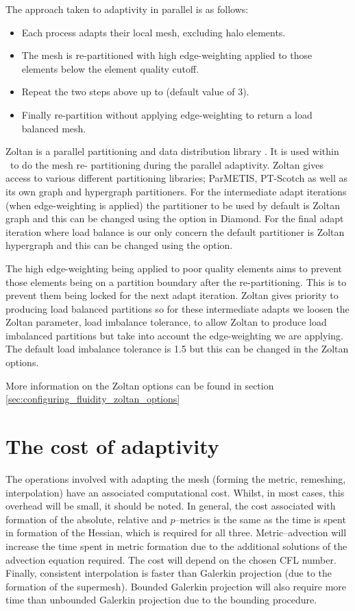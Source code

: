 The approach taken to adaptivity in parallel is as follows:

\begin{itemize}
\item Each process adapts their local mesh, excluding halo elements.
\item The mesh is re-partitioned with high edge-weighting applied to those
elements below the element quality cutoff.
\item Repeat the two steps above up to  (default value of $3$).
\item Finally re-partition without applying edge-weighting to return a
load balanced mesh.
\end{itemize} 

Zoltan is a parallel partitioning and data distribution library 
\citep{devine2002}. It is used within \fluidity\ to do the mesh re-
partitioning during the parallel adaptivity. Zoltan gives access to
various different partitioning libraries; ParMETIS, PT-Scotch as well as 
its own graph and hypergraph partitioners. For the intermediate adapt iterations
(when edge-weighting is applied) the partitioner to be used by default
is Zoltan graph and this can be changed using the  option
in Diamond. For the final adapt iteration where load balance is our
only concern the default partitioner is Zoltan hypergraph and this can be
changed using the  option.

The high edge-weighting being applied to poor quality elements aims to
prevent those elements being on a partition boundary after the
re-partitioning. This is to prevent them being locked for the next
adapt iteration. Zoltan gives priority to producing load balanced
partitions so for these intermediate adapts we loosen the Zoltan
parameter, load imbalance tolerance, to allow Zoltan to produce load
imbalanced partitions but take into account the edge-weighting we are
applying. The default load imbalance tolerance is 1.5 but this can be
changed in the Zoltan options.

More information on the Zoltan options can be found in section \ref{sec:configuring_fluidity_zoltan_options}

\section{The cost of adaptivity}

The operations involved with adapting the mesh (forming the metric, remeshing, interpolation) have an associated computational cost. Whilst, in most cases, this overhead will be small, it should be noted. In general, the cost associated with formation of the absolute, relative and $p$--metrics is the same as the time is spent in formation of the Hessian, which is required for all three. Metric--advection will increase the time spent in metric formation due to the additional solutions of the advection equation required. The cost will depend on the chosen CFL number. Finally, consistent interpolation is faster than Galerkin projection (due to the formation of the supermesh). Bounded Galerkin projection will also require more time than unbounded Galerkin projection due to the bounding procedure.

